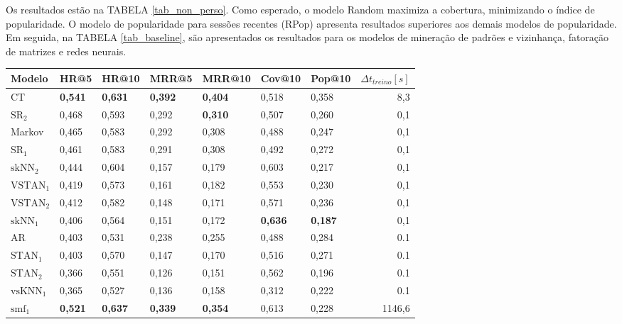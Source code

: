 Os resultados estão na TABELA \ref{tab_non_perso}.  Como esperado, o modelo
Random maximiza a cobertura, minimizando o índice de popularidade. O modelo de
popularidade para sessões recentes (RPop) apresenta resultados superiores aos
demais modelos de popularidade. Em seguida, na TABELA \ref{tab_baseline}, são
apresentados os resultados para os modelos de mineração de padrões e vizinhança,
fatoração de matrizes e redes neurais.

\begin{table}[htbp]
  \centering
  \begin{tabular}{|l|l|l|l|l|l|l|r|}
    \hline
    Modelo & HR@5 & HR@10 & MRR@5 & MRR@10 & Cov@10 & Pop@10 & $\Delta t_{treino} [s]$ \\
    \hline
    CT & \textbf{0,541} & \textbf{0,631} & \textbf{0,392} & \textbf{0,404} & 0,518 & 0,358 & 8,3 \\
    \hline        
    $\text{SR}_{2}$ & 0,468 & 0,593 & 0,292 & \textbf{0,310} & 0,507 & 0,260 & 0,1 \\
    \hline
    Markov  & 0,465 & 0,583 & 0,292 & 0,308 & 0,488 & 0,247 & 0,1 \\
    \hline
    $\text{SR}_{1}$ & 0,461 & 0,583 & 0,291 & 0,308 & 0,492 & 0,272 & 0,1 \\
    \hline
    $\text{skNN}_{2}$ & 0,444 & 0,604 & 0,157 & 0,179 & 0,603 & 0,217 & 0,1 \\
    \hline
    $\text{VSTAN}_{1}$ & 0,419 & 0,573 & 0,161 & 0,182 & 0,553 & 0,230 & 0,1 \\
    \hline
    $\text{VSTAN}_{2}$ & 0,412 & 0,582 & 0,148 & 0,171 & 0,571 & 0,236 & 0,1 \\
    \hline
    $\text{skNN}_{1}$ & 0,406 & 0,564 & 0,151 & 0,172 & \textbf{0,636} & \textbf{0,187} & 0,1 \\
    \hline
    AR & 0,403 & 0,531 & 0,238 & 0,255 & 0,488 & 0,284 & 0.1 \\
    \hline
    $\text{STAN}_{1}$ & 0,403 & 0,570 & 0,147 & 0,170 & 0,516 & 0,271 & 0.1 \\
    \hline
    $\text{STAN}_{2}$ & 0,366 & 0,551 & 0,126 & 0,151 & 0,562 & 0,196 & 0.1 \\
    \hline
$\text{vsKNN}_{1}$ & 0,365 & 0,527 & 0,136 & 0,158 & 0,312 & 0,222 & 0.1 \\
\hline
\hline
    $\text{smf}_1$ & \textbf{0,521} & \textbf{0,637} & \textbf{0,339} & \textbf{0,354} & 0,613 & 0,228 & 1146,6 \\

\end{tabular}
\end{table}
